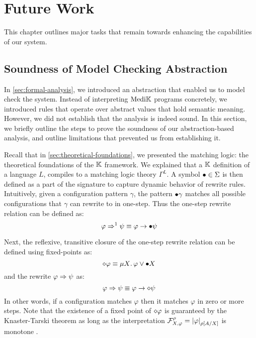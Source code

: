 \chapter{Future Work}

This chapter outlines major tasks that remain towards enhancing the capabilities
of our system.

\section{Soundness of Model Checking Abstraction}\label{sec:abstraction-soundness}

In \autoref{sec:formal-analysis}, we introduced an abstraction that enabled us
to model check the system. Instead of interpreting $\text{Medi}\mathbb{K}{}{}$ programs
concretely, we introduced rules that operate over abstract values
that hold semantic meaning. However, we did not establish that the analysis is
indeed sound. In this section, we briefly outline the steps to prove the
soundness of our abstraction-based analysis, and outline limitations that
prevented us from establishing it.

Recall that in \autoref{sec:theoretical-foundations}, we presented the
matching logic: the theoretical foundations of the $\mathbb{K}$ framework. We explained
that a $\mathbb{K}$ definition of a language $L$, compiles to a matching logic theory
$\Gamma^L$. A symbol ${\bullet} \in \Sigma$ is then defined as a part of the
signature to capture dynamic behavior of rewrite rules.
Intuitively, given a configuration
pattern $\gamma$, the pattern ${\bullet} \gamma$ matches all possible
configurations that $\gamma$ can rewrite to in one-step. Thus
the one-step rewrite relation can be defined as:
$$
  \varphi \Rightarrow^1 \psi \equiv \varphi \to {\bullet} \psi
$$

Next, the reflexive, transitive closure of the one-step rewrite relation
can be defined using fixed-points as:
$$
  \diamond \varphi \equiv \mu X \mathord{.\,} \varphi \vee {\bullet} X
$$
and the rewrite $\varphi \Rightarrow \psi$ as:
$$
  \varphi \Rightarrow \psi \equiv \varphi \to \diamond \psi
$$
In other words, if a configuration matches
$\varphi$ then it matches $\varphi$ in zero or more steps.
Note that the existence of a fixed point of $\diamond\varphi$
is guaranteed by the Knaster-Tarski theorem as long as the interpretation
$\mathcal{F}^{\rho}_{X,\varphi} = \left|\varphi\right|_{\rho\left[A / X\right]}$
is monotone \cite{ChenLICS19}.


